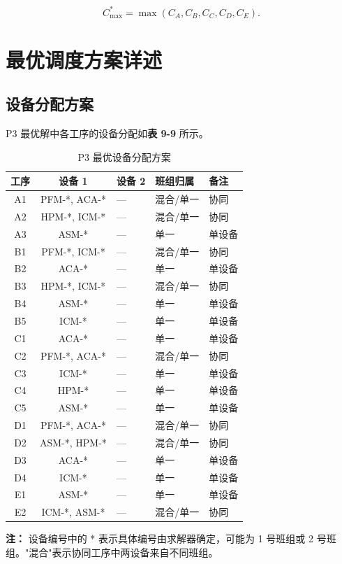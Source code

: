 \documentclass[UTF8,a4paper,12pt]{ctexart}
\begin{document}
\begin{equation}
C_{\max}^* = \max(C_A, C_B, C_C, C_D, C_E). \tag{9-8}
\end{equation}

\section{最优调度方案详述}
\subsection{设备分配方案}
P3 最优解中各工序的设备分配如\textbf{表 9-9} 所示。

\begin{table}[htbp]
  \centering
  \caption{P3 最优设备分配方案}
  \label{tab:p3_optimal_alloc}
  \begin{tabular}{cclll}
    \toprule
    工序 & 设备 1 & 设备 2 & 班组归属 & 备注 \\
    \midrule
    A1 & PFM-*, ACA-* & — & 混合/单一 & 协同 \\
    A2 & HPM-*, ICM-* & — & 混合/单一 & 协同 \\
    A3 & ASM-* & — & 单一 & 单设备 \\
    B1 & PFM-*, ICM-* & — & 混合/单一 & 协同 \\
    B2 & ACA-* & — & 单一 & 单设备 \\
    B3 & HPM-*, ICM-* & — & 混合/单一 & 协同 \\
    B4 & ASM-* & — & 单一 & 单设备 \\
    B5 & ICM-* & — & 单一 & 单设备 \\
    C1 & ACA-* & — & 单一 & 单设备 \\
    C2 & PFM-*, ACA-* & — & 混合/单一 & 协同 \\
    C3 & ICM-* & — & 单一 & 单设备 \\
    C4 & HPM-* & — & 单一 & 单设备 \\
    C5 & ASM-* & — & 单一 & 单设备 \\
    D1 & PFM-*, ACA-* & — & 混合/单一 & 协同 \\
    D2 & ASM-*, HPM-* & — & 混合/单一 & 协同 \\
    D3 & ACA-* & — & 单一 & 单设备 \\
    D4 & ICM-* & — & 单一 & 单设备 \\
    E1 & ASM-* & — & 单一 & 单设备 \\
    E2 & ICM-*, ASM-* & — & 混合/单一 & 协同 \\
    \bottomrule
  \end{tabular}
\end{table}
\noindent \textbf{注：} 设备编号中的 * 表示具体编号由求解器确定，可能为 1 号班组或 2 号班组。"混合"表示协同工序中两设备来自不同班组。
\end{document}
